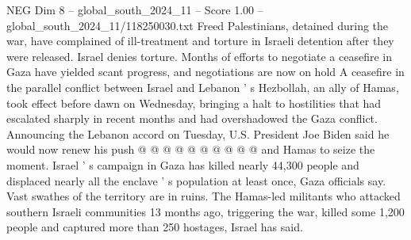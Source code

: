 \begin{textsample}{NEG Dim 8 – global\_south\_2024\_11 – Score 1.00 – global\_south\_2024\_11/118250030.txt}
Freed Palestinians, detained during the war, have complained of ill-treatment and torture in Israeli detention after they were released.
Israel denies torture.
Months of efforts to negotiate a ceasefire in Gaza have yielded scant progress, and negotiations are now on hold A ceasefire in the parallel conflict between Israel and Lebanon ' s Hezbollah, an ally of Hamas, took effect before dawn on Wednesday, bringing a halt to hostilities that had escalated sharply in recent months and had overshadowed the Gaza conflict.
Announcing the Lebanon accord on Tuesday, U.S.
President Joe Biden said he would now renew his push @ @ @ @ @ @ @ @ @ @ and Hamas to seize the moment.
Israel ' s campaign in Gaza has killed nearly 44,300 people and displaced nearly all the enclave ' s population at least once, Gaza officials say.
Vast swathes of the territory are in ruins.
The Hamas-led militants who attacked southern Israeli communities 13 months ago, triggering the war, killed some 1,200 people and captured more than 250 hostages, Israel has said.

\end{textsample}
